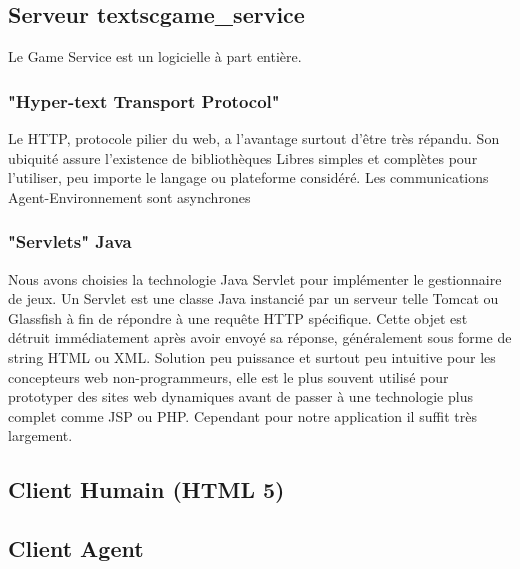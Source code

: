   
  
  
\subsection{Serveur textsc{game_service}}

Le Game Service est un logicielle à part entière.

\subsubsection{"Hyper-text Transport Protocol"}

Le HTTP, protocole pilier du web, a l'avantage surtout d'être très répandu. Son ubiquité assure l'existence de bibliothèques Libres simples et complètes pour l'utiliser, peu importe le langage ou plateforme considéré. 
Les communications Agent-Environnement sont asynchrones 

\subsubsection{"Servlets" Java}

Nous avons choisies la technologie Java Servlet pour implémenter le gestionnaire de jeux. Un Servlet est une classe Java instancié par un serveur telle Tomcat ou Glassfish à fin de répondre à une requête HTTP spécifique. Cette objet est détruit immédiatement après avoir envoyé sa réponse, généralement sous forme de string HTML ou XML.
Solution peu puissance et surtout peu intuitive pour les concepteurs web non-programmeurs, elle est le plus souvent utilisé pour prototyper des sites web dynamiques avant de passer à une technologie plus complet comme JSP ou PHP. Cependant pour notre application il suffit très largement.

\subsection{Client Humain (HTML 5)}
    
\subsection{Client Agent}
    